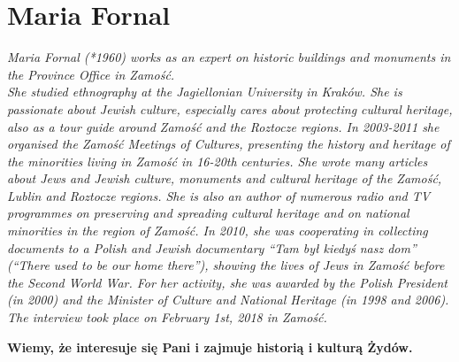 \section{Maria Fornal}
\begin{otherlanguage}{polish}
\textit{Maria Fornal (*1960) works as an expert on historic buildings and monuments in the Province Office in Zamość. \\
She studied ethnography at the Jagiellonian University in Kraków. She is passionate about Jewish culture, especially cares about protecting cultural heritage, also as a tour guide around Zamość and the Roztocze regions. In 2003-2011 she organised the Zamość Meetings of Cultures, presenting the history and heritage of the minorities living in Zamość in 16-20th centuries. She wrote many articles about Jews and Jewish culture, monuments and cultural heritage of the Zamość, Lublin and Roztocze regions. She is also an author of numerous radio and TV programmes on preserving and spreading cultural heritage and on national minorities in the region of Zamość. In 2010, she was cooperating in collecting documents to a Polish and Jewish documentary ``Tam był kiedyś nasz dom'' (``There used to be our home there''), showing the lives of Jews in Zamość before the Second World War. For her activity, she was awarded by the Polish President (in 2000) and the Minister of Culture and National Heritage (in 1998 and 2006). \\
The interview took place on February 1st, 2018 in Zamość.}\par
\vspace*{2em}
\textbf{Wiemy, że interesuje się Pani i zajmuje historią i kulturą Żydów.}
	

\end{otherlanguage}
